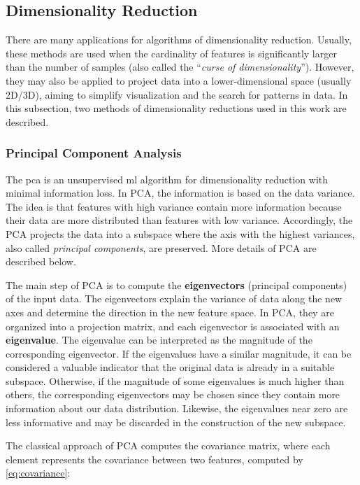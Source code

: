 \subsection{Dimensionality Reduction}

There are many applications for algorithms of dimensionality reduction. Usually, these methods are used when the cardinality of features is significantly larger than the number of samples (also called the ``\textit{curse of dimensionality}''). However, they may also be applied to project data into a lower-dimensional space (usually 2D/3D), aiming to simplify visualization and the search for patterns in data. In this subsection, two methods of dimensionality reductions used in this work are described.

\subsubsection{Principal Component Analysis}
\label{sec:pca}

The \acf{pca} \citep{pca} is an unsupervised \acl{ml} algorithm for dimensionality reduction with minimal information loss. In PCA, the information is based on the data variance. The idea is that features with high variance contain more information because their data are more distributed than features with low variance. Accordingly, the PCA projects the data into a subspace where the axis with the highest variances, also called \textit{principal components}, are preserved. More details of PCA are described below.

The main step of PCA is to compute the \textbf{eigenvectors} (principal components) of the input data. The eigenvectors explain the variance of data along the new axes and determine the direction in the new feature space. In PCA, they are organized into a projection matrix, and each eigenvector is associated with an \textbf{eigenvalue}. The eigenvalue can be interpreted as the magnitude of the corresponding eigenvector. If the eigenvalues have a similar magnitude, it can be considered a valuable indicator that the original data is already in a suitable subspace. Otherwise, if the magnitude of some eigenvalues is much higher than others, the corresponding eigenvectors may be chosen since they contain more information about our data distribution. Likewise, the eigenvalues near zero are less informative and may be discarded in the construction of the new subspace. 

The classical approach of PCA \citep{pca} computes the covariance matrix, where each element represents the covariance between two features, computed by \autoref{eq:covariance}:

